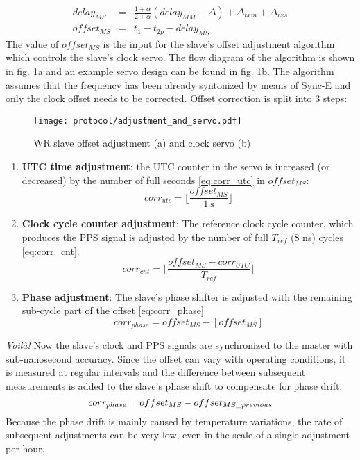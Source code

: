 \begin{eqnarray}
\label{eq:delaymm_full_3}delay_{MS} & = & \frac{1+\alpha}{2+\alpha} (delay_{MM}
- \Delta) + \Delta_{txm} + \Delta_{rxs} \\
\label{eq:offset_ms} offset_{MS} & = & t_{1} - t_{2p} - delay_{MS}
\end{eqnarray}
The value of $offset_{MS}$ is the input for the slave's offset adjustment
algorithm which controls the slave's clock servo. The flow diagram of the
algorithm is shown in fig. \ref{fig:adjustment_and_servo}a and an example
servo design can be found in fig. \ref{fig:adjustment_and_servo}b. The
algorithm assumes that the frequency has been already syntonized by means
of Sync-E and only the clock offset needs to be corrected. Offset correction
is split into 3 steps:
\begin{figure}[ht!]
  \centering
  \texttt{[image: protocol/adjustment\_and\_servo.pdf]}
  \caption{WR slave offset adjustment (a) and clock servo (b)}
  \label{fig:adjustment_and_servo}
\end{figure}
\begin{enumerate}
\item \textbf{UTC time adjustment}: the UTC counter in the servo is
increased (or decreased) by the number of full seconds \ref{eq:corr_utc}
in $offset_{MS}$:
\begin{equation}
corr_{utc} = \lfloor{\frac{offset_{MS}}{1 \mathrm{~s}}}\rfloor
\label{eq:corr_utc}
\end{equation}
\item \textbf{Clock cycle counter adjustment}: The reference clock cycle
counter, which produces the PPS signal is adjusted by the number of full
$T_{ref}$ (8 ns) cycles \ref{eq:corr_cnt}.
\begin{equation}
corr_{cnt} = \lfloor \frac{offset_{MS} - corr_{UTC}}{T_{ref}}\rfloor
\label{eq:corr_cnt}
\end{equation}
\item \textbf{Phase adjustment}: The slave's phase shifter is adjusted with
the remaining sub-cycle part of the offset \ref{eq:corr_phase}
\begin{equation}
corr_{phase} = offset_{MS} - [offset_{MS}]
\label{eq:corr_phase}
\end{equation}
\end{enumerate}
\emph{Voil\`{a}!} Now the slave's clock and PPS signals are synchronized to the
master with sub-nanosecond accuracy. Since the offset can vary with operating
conditions, it is measured at regular intervals and the difference between
subsequent measurements is added to the slave's phase shift to compensate for
phase drift:
\begin{equation}
corr_{phase} = offset_{MS} - offset_{MS\us previous}
\label{eq:corr_phase2}
\end{equation}
Because the phase drift is mainly caused by temperature variations, the rate
of subsequent adjustments can be very low, even in the scale of a single
adjustment per hour.

